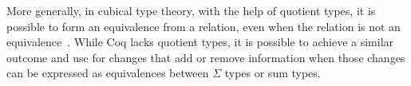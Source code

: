 More generally, in cubical type theory, with the help of quotient types, it is possible to form an equivalence
from a relation, even when the relation is not an equivalence~\cite{angiuli2020internalizing}.
While Coq lacks quotient types,
it is possible to achieve a similar outcome and use \toolname for changes that add or remove information
when those changes can be expressed as equivalences between $\Sigma$ types or sum types.
%
%
%
%
%
%


